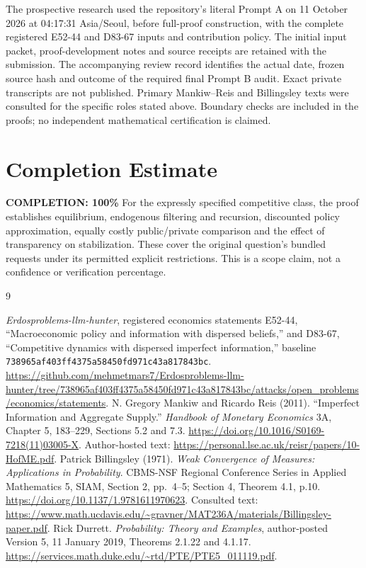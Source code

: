 \documentclass[11pt,a4paper]{article}
\begin{document}
The prospective research used the repository's literal Prompt A on
11 October 2026 at 04:17:31 Asia/Seoul, before full-proof construction, with
the complete registered E52-44 and D83-67 inputs and contribution policy.
The initial input packet, proof-development notes and source receipts are
retained with the submission. The accompanying review record identifies the
actual date, frozen source hash and outcome of the required final Prompt B
audit. Exact private transcripts are not
published. Primary Mankiw--Reis and Billingsley texts were consulted for the
specific roles stated above. Boundary checks are included in the proofs;
no independent mathematical certification is claimed.

\section{Completion Estimate}
\noindent\textbf{COMPLETION: 100\%}
For the expressly specified competitive class, the proof establishes equilibrium,
endogenous filtering and recursion, discounted policy approximation, equally
costly public/private comparison and the effect of transparency on stabilization.
These cover the original question's bundled requests under its permitted explicit
restrictions. This is a scope claim, not a confidence or verification percentage.

\begin{thebibliography}{9}
\small\raggedright
{}
\emph{Erdosproblems-llm-hunter}, registered economics statements E52-44,
``Macroeconomic policy and information with dispersed beliefs,'' and D83-67,
``Competitive dynamics with dispersed imperfect information,'' baseline
\texttt{738965af403ff4375a58450fd971c43a817843bc}.
\url{https://github.com/mehmetmars7/Erdosproblems-llm-hunter/tree/738965af403ff4375a58450fd971c43a817843bc/attacks/open_problems/economics/statements}.
N. Gregory Mankiw and Ricardo Reis (2011).
``Imperfect Information and Aggregate Supply.''
\emph{Handbook of Monetary Economics} 3A, Chapter 5, 183--229,
Sections 5.2 and 7.3.
\url{https://doi.org/10.1016/S0169-7218(11)03005-X}.
Author-hosted text:
\url{https://personal.lse.ac.uk/reisr/papers/10-HofME.pdf}.
Patrick Billingsley (1971).
\emph{Weak Convergence of Measures: Applications in Probability}.
CBMS-NSF Regional Conference Series in Applied Mathematics 5, SIAM,
Section 2, pp.\ 4--5; Section 4, Theorem 4.1, p.10.
\url{https://doi.org/10.1137/1.9781611970623}.
Consulted text:
\url{https://www.math.ucdavis.edu/~gravner/MAT236A/materials/Billingsley-paper.pdf}.
Rick Durrett.
\emph{Probability: Theory and Examples}, author-posted Version 5,
11 January 2019, Theorems 2.1.22 and 4.1.17.
\url{https://services.math.duke.edu/~rtd/PTE/PTE5_011119.pdf}.
\end{thebibliography}
\end{document}
